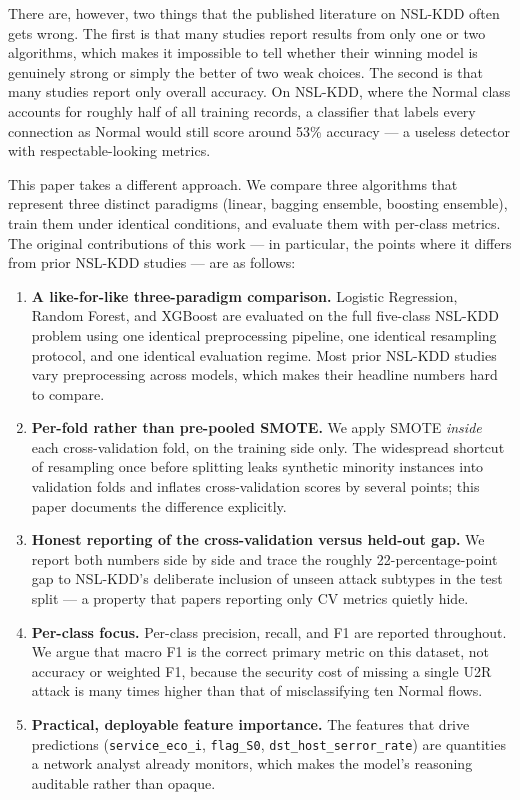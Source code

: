\documentclass[conference, twocolumn]{IEEEtran}
\begin{document}
There are, however, two things that the published literature on NSL-KDD often gets wrong. The first is that many studies report results from only one or two algorithms, which makes it impossible to tell whether their winning model is genuinely strong or simply the better of two weak choices. The second is that many studies report only overall accuracy. On NSL-KDD, where the Normal class accounts for roughly half of all training records, a classifier that labels every connection as Normal would still score around 53\% accuracy --- a useless detector with respectable-looking metrics.

This paper takes a different approach. We compare three algorithms that represent three distinct paradigms (linear, bagging ensemble, boosting ensemble), train them under identical conditions, and evaluate them with per-class metrics. The original contributions of this work --- in particular, the points where it differs from prior NSL-KDD studies --- are as follows:

\begin{enumerate}
    \item \textbf{A like-for-like three-paradigm comparison.} Logistic Regression, Random Forest, and XGBoost are evaluated on the full five-class NSL-KDD problem using one identical preprocessing pipeline, one identical resampling protocol, and one identical evaluation regime. Most prior NSL-KDD studies vary preprocessing across models, which makes their headline numbers hard to compare.
    \item \textbf{Per-fold rather than pre-pooled SMOTE.} We apply SMOTE \emph{inside} each cross-validation fold, on the training side only. The widespread shortcut of resampling once before splitting leaks synthetic minority instances into validation folds and inflates cross-validation scores by several points; this paper documents the difference explicitly.
    \item \textbf{Honest reporting of the cross-validation versus held-out gap.} We report both numbers side by side and trace the roughly 22-percentage-point gap to NSL-KDD's deliberate inclusion of unseen attack subtypes in the test split --- a property that papers reporting only CV metrics quietly hide.
    \item \textbf{Per-class focus.} Per-class precision, recall, and F1 are reported throughout. We argue that macro F1 is the correct primary metric on this dataset, not accuracy or weighted F1, because the security cost of missing a single U2R attack is many times higher than that of misclassifying ten Normal flows.
    \item \textbf{Practical, deployable feature importance.} The features that drive predictions (\texttt{service\_eco\_i}, \texttt{flag\_S0}, \texttt{dst\_host\_serror\_rate}) are quantities a network analyst already monitors, which makes the model's reasoning auditable rather than opaque.
\end{enumerate}
\end{document}
